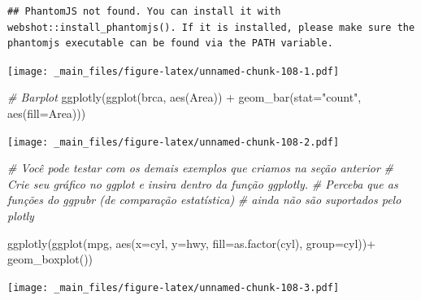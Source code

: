 \documentclass[
]{book}
\newenvironment{Shaded}{\begin{snugshade}}{\end{snugshade}}
\newcommand{\AttributeTok}[1]{\textcolor[rgb]{0.77,0.63,0.00}{#1}}
\newcommand{\CommentTok}[1]{\textcolor[rgb]{0.56,0.35,0.01}{\textit{#1}}}
\newcommand{\FunctionTok}[1]{\textcolor[rgb]{0.00,0.00,0.00}{#1}}
\newcommand{\NormalTok}[1]{#1}
\newcommand{\SpecialCharTok}[1]{\textcolor[rgb]{0.00,0.00,0.00}{#1}}
\newcommand{\StringTok}[1]{\textcolor[rgb]{0.31,0.60,0.02}{#1}}
\begin{document}
\begin{verbatim}
## PhantomJS not found. You can install it with webshot::install_phantomjs(). If it is installed, please make sure the phantomjs executable can be found via the PATH variable.
\end{verbatim}

\texttt{[image: \_main\_files/figure-latex/unnamed-chunk-108-1.pdf]}

\begin{Shaded}
\begin{Highlighting}[]
\CommentTok{\# Barplot}
\FunctionTok{ggplotly}\NormalTok{(}\FunctionTok{ggplot}\NormalTok{(brca,}
                \FunctionTok{aes}\NormalTok{(Area)) }\SpecialCharTok{+}
           \FunctionTok{geom\_bar}\NormalTok{(}\AttributeTok{stat=}\StringTok{"count"}\NormalTok{, }\FunctionTok{aes}\NormalTok{(}\AttributeTok{fill=}\NormalTok{Area)))}
\end{Highlighting}
\end{Shaded}

\texttt{[image: \_main\_files/figure-latex/unnamed-chunk-108-2.pdf]}

\begin{Shaded}
\begin{Highlighting}[]
\CommentTok{\# Você pode testar com os demais exemplos que criamos na seção anterior}
\CommentTok{\# Crie seu gráfico no ggplot e insira dentro da função ggplotly.}
\CommentTok{\# Perceba que as funções do ggpubr (de comparação estatística)}
\CommentTok{\# ainda não são suportados pelo plotly}

\FunctionTok{ggplotly}\NormalTok{(}\FunctionTok{ggplot}\NormalTok{(mpg, }\FunctionTok{aes}\NormalTok{(}\AttributeTok{x=}\NormalTok{cyl, }\AttributeTok{y=}\NormalTok{hwy, }\AttributeTok{fill=}\FunctionTok{as.factor}\NormalTok{(cyl), }\AttributeTok{group=}\NormalTok{cyl))}\SpecialCharTok{+}
           \FunctionTok{geom\_boxplot}\NormalTok{())}
\end{Highlighting}
\end{Shaded}

\texttt{[image: \_main\_files/figure-latex/unnamed-chunk-108-3.pdf]}

\begin{Shaded}
\end{Shaded}
\end{document}
